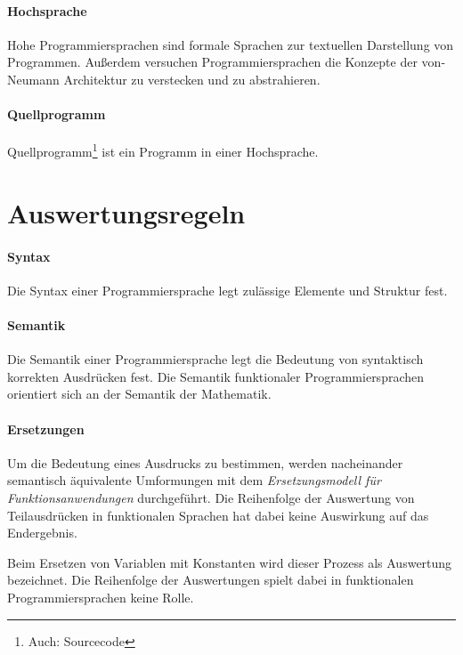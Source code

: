 \documentclass[../main.tex]{subfiles}
\begin{document}
            \paragraph{Hochsprache}
                Hohe Programmiersprachen sind formale Sprachen zur textuellen Darstellung von Programmen. Außerdem versuchen Programmiersprachen die Konzepte der von-Neumann Architektur zu verstecken und zu abstrahieren.
                
            \paragraph{Quellprogramm}
                Quellprogramm\footnote{Auch: Sourcecode} ist ein Programm in einer Hochsprache.
                
    \section{Auswertungsregeln}
        \paragraph{Syntax}
            Die Syntax einer Programmiersprache legt zulässige Elemente und Struktur fest.
            
        \paragraph{Semantik}
            Die Semantik einer Programmiersprache legt die Bedeutung von syntaktisch korrekten Ausdrücken fest. Die Semantik funktionaler Programmiersprachen orientiert sich an der Semantik der Mathematik.
            
        \paragraph{Ersetzungen}
            Um die Bedeutung eines Ausdrucks zu bestimmen, werden nacheinander semantisch äquivalente Umformungen mit dem \emph{Ersetzungsmodell für Funktionsanwendungen} durchgeführt. Die Reihenfolge der Auswertung von Teilausdrücken in funktionalen Sprachen hat dabei keine Auswirkung auf das Endergebnis.
            
            Beim Ersetzen von Variablen mit Konstanten wird dieser Prozess als Auswertung bezeichnet. Die Reihenfolge der Auswertungen spielt dabei in funktionalen Programmiersprachen keine Rolle.
            
\end{document}
